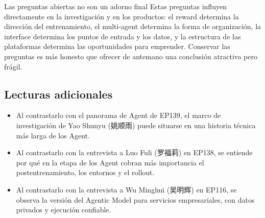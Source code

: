 \begin{warningbox}{Las preguntas abiertas no son un adorno final}
Estas preguntas influyen directamente en la investigación y en los productos: el reward determina la dirección del entrenamiento, el multi-agent determina la forma de organización, la interface determina los puntos de entrada y los datos, y la estructura de las plataformas determina las oportunidades para emprender. Conservar las preguntas es más honesto que ofrecer de antemano una conclusión atractiva pero frágil.
\end{warningbox}

\subsection{Lecturas adicionales}

\begin{itemize}
\item Al contrastarlo con el panorama de Agent de EP139, el marco de investigación de Yao Shunyu (姚顺雨) puede situarse en una historia técnica más larga de los Agent.
\item Al contrastarlo con la entrevista a Luo Fuli (罗福莉) en EP138, se entiende por qué en la etapa de los Agent cobran más importancia el postentrenamiento, los entornos y el rollout.
\item Al contrastarlo con la entrevista a Wu Minghui (吴明辉) en EP116, se observa la versión del Agentic Model para servicios empresariales, con datos privados y ejecución confiable.
\end{itemize}


